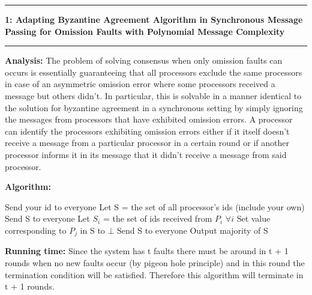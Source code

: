 \documentclass[11pt]{article}
\newcommand\question[2]{\vspace{.25in}\hrule\textbf{#1: #2}\vspace{.5em}\hrule\vspace{.10in}}
\newcommand\analysis{\vspace{.10in}\textbf{Analysis: }\newline}
\newcommand\algorithm{\vspace{.10in}\textbf{Algorithm: }}
\newcommand\runtime{\vspace{.10in}\textbf{Running time: }\newline}
\begin{document}
\raggedright
\newcommand\NAME{Siddharth Joshi}  %
\newcommand\HWNUM{4}              %


\question{1}{Adapting Byzantine Agreement Algorithm in Synchronous Message Passing for Omission Faults with Polynomial Message Complexity} 

\analysis
The problem of solving consensus when only omission faults can occurs is essentially guaranteeing that all processors exclude the same processors in case of an asymmetric omission error where some processors received a message but others didn't. In particular, this is solvable in a manner identical to the solution for byzantine agreement in a synchronous setting by simply ignoring the messages from processors that have exhibited omission errors. 
A processor can identify the processors exhibiting omission errors either if it itself doesn't receive a message from a particular processor in a certain round or if another processor informs it in its message that it didn't receive a message from said processor. 

\algorithm
\begin{algorithmic}
\State Send your id to everyone 
\State Let S = the set of all processor's ids (include your own) 
\State Send S to everyone 
\State Let $S_i$ = the set of ids received from $P_i$ $\forall i$ 
            \State Set value corresponding to $P_j$ in S to $\bot$
        \EndIf
    \EndFor
    \State Send S to everyone 
\EndWhile
\State Output majority of S
\end{algorithmic}

\runtime
Since the system has t faults there must be around in t + 1 rounds when no new faults occur (by pigeon hole principle) and in this round the termination condition will be satisfied. Therefore this algorithm will terminate in t + 1 rounds.
\end{document}
